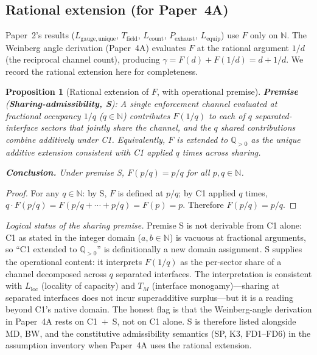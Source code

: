 \documentclass[11pt,a4paper]{article}
\newtheorem{proposition}[theorem]{Proposition}
\theoremstyle{definition}
\begin{document}
\subsection{Rational extension (for Paper~4A)}
\label{sec:cauchy_rational}

Paper~2's results ($L_{\mathrm{gauge,unique}}$, $T_{\mathrm{field}}$,
$L_{\mathrm{count}}$, $P_{\mathrm{exhaust}}$, $L_{\mathrm{equip}}$) use
$F$ only on $\mathbb{N}$.  The Weinberg angle derivation (Paper~4A)
evaluates $F$ at the rational argument $1/d$ (the reciprocal channel
count), producing $\gamma = F(d) + F(1/d) = d + 1/d$.  We record the
rational extension here for completeness.

\begin{proposition}[Rational extension of $F$, with operational premise]\label{prop:rational_ext}
\textbf{Premise} (\textbf{Sharing-admissibility, S}): A single
enforcement channel evaluated at fractional occupancy $1/q$ ($q \in \mathbb{N}$)
contributes $F(1/q)$ to each of $q$ separated-interface sectors that
jointly share the channel, and the $q$ shared contributions combine
additively under C1.  Equivalently, $F$ is extended to $\mathbb{Q}_{>0}$
as the unique additive extension consistent with C1 applied $q$ times
across sharing.

\smallskip\noindent\textbf{Conclusion.}  Under premise S, $F(p/q) = p/q$
for all $p, q \in \mathbb{N}$.
\end{proposition}

\begin{proof}
For any $q \in \mathbb{N}$: by S, $F$ is defined at $p/q$; by C1
applied $q$ times, $q \cdot F(p/q) = F(p/q + \cdots + p/q) = F(p) = p$.
Therefore $F(p/q) = p/q$.
\end{proof}

\smallskip\noindent\textit{Logical status of the sharing premise.}\quad
Premise S is not derivable from C1 alone: C1 as stated in the integer
domain ($a, b \in \mathbb{N}$) is vacuous at fractional arguments, so
``C1 extended to $\mathbb{Q}_{>0}$'' is definitionally a new domain
assignment.  S supplies the operational content: it interprets $F(1/q)$
as the per-sector share of a channel decomposed across $q$ separated
interfaces.  The interpretation is consistent with $L_{\mathrm{loc}}$
(locality of capacity) and $T_M$ (interface monogamy)---sharing at
separated interfaces does not incur superadditive surplus---but it is
a reading beyond C1's native domain.  The honest flag is that the
Weinberg-angle derivation in Paper~4A rests on C1~$+$~S, not on C1
alone.  S is therefore listed alongside MD, BW, and the constitutive
admissibility semantics (SP, K3, FD1--FD6) in the assumption inventory
when Paper~4A uses the rational extension.
\end{document}
